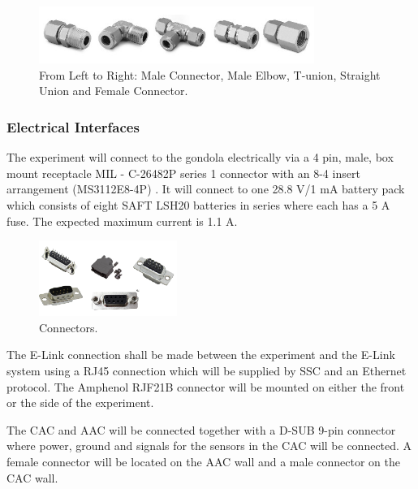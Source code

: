 \begin{figure}[H]
    \centering
    \includegraphics[width=0.8\textwidth]{4-experiment-design/img/Mechanical/AAC-interfaces.jpg}
    \caption{From Left to Right: Male Connector, Male Elbow, T-union, Straight Union and Female Connector.}
    \label{fig:AAC-interfaces-fittings}
\end{figure}




\subsubsection{Electrical Interfaces}
\label{sec:4.2.3}

The experiment will connect to the gondola electrically via a 4 pin, male, box mount receptacle MIL - C-26482P series 1 connector with an 8-4 insert arrangement (MS3112E8-4P) \cite{BexusManual}. It will connect to one 28.8 V/1 mA battery pack which consists of eight SAFT LSH20 batteries in series where each has a 5 A fuse\cite{BexusManual}. The expected maximum current is 1.1 A.

\begin{figure}[H]
    \centering
    \includegraphics[width=0.4\textwidth]{4-experiment-design/img/connectors.png}
    \caption{Connectors.}
    \label{fig:connectors}
\end{figure}

The E-Link connection shall be made between the experiment and the E-Link system using a RJ45 connection which will be supplied by SSC and an Ethernet protocol. The Amphenol RJF21B connector will be mounted on either the front or the side of the experiment\cite{BexusManual}.  

The CAC and AAC will be connected together with a D-SUB 9-pin connector where power, ground and signals for the sensors in the CAC will be connected. A female connector will be located on the AAC wall and a male connector on the CAC wall.

